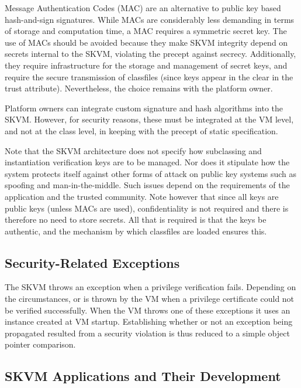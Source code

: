 \documentclass{llncs}
\begin{document}
Message Authentication Codes (MAC) are an alternative to public key
based hash-and-sign signatures. While MACs are considerably less
demanding in terms of storage and computation time, a MAC requires a
symmetric secret key. The use of MACs should be avoided because they
make SKVM integrity depend on secrets internal to the SKVM, violating
the precept against secrecy. Additionally, they require infrastructure
for the storage and management of secret keys, and require the secure
transmission of classfiles (since keys appear in the clear in the trust
attribute). Nevertheless, the choice remains with the platform owner.

Platform owners can integrate custom signature and hash algorithms into
the SKVM. However, for security reasons, these must be integrated at the
VM level, and not at the class level, in keeping with the precept of
static specification.

Note that the SKVM architecture does not specify how subclassing and
instantiation verification keys are to be managed. Nor does it stipulate
how the system protects itself against other forms of attack on public
key systems such as spoofing and man-in-the-middle. Such issues depend
on the requirements of the application and the trusted community. Note
however that since all keys are public keys (unless MACs are used),
confidentiality is not required and there is therefore no need to store
secrets. All that is required is that the keys be authentic, and the
mechanism by which classfiles are loaded ensures this.

\subsection{Security-Related Exceptions}


The SKVM throws an exception when a privilege verification fails.
Depending on the circumstances,  or
 is thrown by the VM when a privilege certificate
could not be verified successfully. When the VM throws one of these
exceptions it uses an instance created at VM startup. Establishing
whether or not an exception being propagated resulted from a security
violation is thus reduced to a simple object pointer comparison.


\subsection{SKVM Applications and Their Development}
\end{document}
